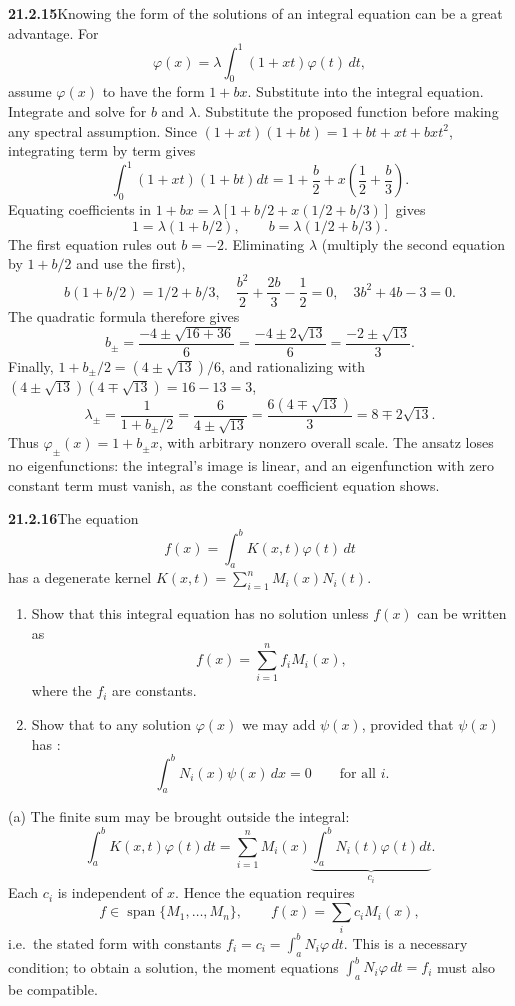 \par\bigskip
\noindent\textbf{21.2.15}\quad Knowing the form of the solutions
of an integral equation can be a great advantage. For
\[
\varphi(x)=\lambda\int_{0}^{1}(1+xt)\varphi(t)\,dt,
\]
assume $\varphi(x)$ to have the form $1+bx$. Substitute into the
integral equation. Integrate and solve for $b$ and $\lambda$.
\solution
Substitute the proposed function before making any spectral
assumption. Since $(1+xt)(1+bt)=1+bt+xt+bxt^2$, integrating term by term
gives
\[
\int_0^1(1+xt)(1+bt)dt
=1+\frac b2+x\left(\frac12+\frac b3\right).
\]
Equating coefficients in
$1+bx=\lambda[1+b/2+x(1/2+b/3)]$ gives
\[
1=\lambda(1+b/2),\qquad
b=\lambda(1/2+b/3).
\]
The first equation rules out $b=-2$. Eliminating $\lambda$ (multiply
the second equation by $1+b/2$ and use the first),
\[
b(1+b/2)=1/2+b/3,
\quad \frac{b^2}{2}+\frac{2b}{3}-\frac12=0,
\quad 3b^2+4b-3=0.
\]
The quadratic formula therefore gives
\[
b_\pm=\frac{-4\pm\sqrt{16+36}}6
=\frac{-4\pm2\sqrt{13}}6
=\frac{-2\pm\sqrt{13}}3.
\]
Finally, $1+b_\pm/2=(4\pm\sqrt{13})/6$, and rationalizing with
$(4\pm\sqrt{13})(4\mp\sqrt{13})=16-13=3$,
\[
\lambda_\pm=\frac1{1+b_\pm/2}
=\frac6{4\pm\sqrt{13}}
=\frac{6(4\mp\sqrt{13})}{3}
=\boxed{8\mp2\sqrt{13}}.
\]
Thus $\boxed{\varphi_\pm(x)=1+b_\pm x}$, with arbitrary
nonzero overall scale. The ansatz loses no eigenfunctions:
the integral's image is linear, and an eigenfunction with zero
constant term must vanish, as the constant coefficient equation shows.


\par\bigskip
\noindent\textbf{21.2.16}\quad The equation
\[
f(x)=\int_{a}^{b}K(x,t)\varphi(t)\,dt
\]
has a degenerate kernel
$K(x,t)=\displaystyle\sum_{i=1}^{n}M_{i}(x)N_{i}(t)$.
\begin{enumerate}
\item[(a)] Show that this integral equation has no solution unless
$f(x)$ can be written as
\[
f(x)=\sum_{i=1}^{n}f_{i}M_{i}(x),
\]
where the $f_{i}$ are constants.
\item[(b)] Show that to any solution $\varphi(x)$ we may add
$\psi(x)$, provided that $\psi(x)$ has :
\[
\int_{a}^{b}N_{i}(x)\psi(x)\,dx=0\qquad\text{for all }i.
\]
\end{enumerate}
\solution
(a) The finite sum may be brought outside the integral:
\[
\int_a^bK(x,t)\varphi(t)dt
=\sum_{i=1}^n M_i(x)
\underbrace{\int_a^bN_i(t)\varphi(t)dt}_{c_i}.
\]
Each $c_i$ is independent of $x$. Hence the equation requires
\[
\boxed{f\in\operatorname{span}\{M_1,\ldots,M_n\}},
\qquad f(x)=\sum_i c_iM_i(x),
\]
i.e.\ the stated form with constants $f_i=c_i=\int_a^bN_i\varphi\,dt$.
This is a necessary condition; to obtain a solution, the moment
equations $\int_a^bN_i\varphi\,dt=f_i$ must also be compatible.


